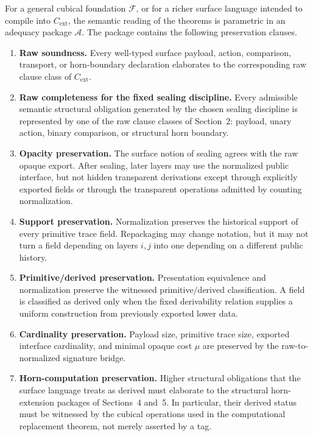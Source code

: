 \documentclass{lmcs}
\begin{document}
\begin{rem}
For a general cubical foundation \(\mathcal F\), or for a richer surface language intended to
compile into \(C_{\mathrm{ext}}\), the semantic reading of the theorems is parametric in an
adequacy package \(\mathcal A\).  The package contains the following preservation clauses.

\begin{enumerate}
\item \textbf{Raw soundness.}  Every well-typed surface payload, action, comparison,
transport, or horn-boundary declaration elaborates to the corresponding raw clause class of
\(C_{\mathrm{ext}}\).

\item \textbf{Raw completeness for the fixed sealing discipline.}  Every admissible semantic
structural obligation generated by the chosen sealing discipline is represented by one of the
raw clause classes of Section~2: payload, unary action, binary comparison, or structural horn
boundary.

\item \textbf{Opacity preservation.}  The surface notion of sealing agrees with the raw opaque
export.  After sealing, later layers may use the normalized public interface, but not hidden
transparent derivations except through explicitly exported fields or through the transparent
operations admitted by counting normalization.

\item \textbf{Support preservation.}  Normalization preserves the historical support of every
primitive trace field.  Repackaging may change notation, but it may not turn a field depending
on layers \(i,j\) into one depending on a different public history.

\item \textbf{Primitive/derived preservation.}  Presentation equivalence and normalization
preserve the witnessed primitive/derived classification.  A field is classified as derived
only when the fixed derivability relation supplies a uniform construction from previously
exported lower data.

\item \textbf{Cardinality preservation.}  Payload size, primitive trace size, exported
interface cardinality, and minimal opaque cost \(\mu\) are preserved by the raw-to-normalized
signature bridge.

\item \textbf{Horn-computation preservation.}  Higher structural obligations that the surface
language treats as derived must elaborate to the structural horn-extension packages of
Sections~4 and~5.  In particular, their derived status must be witnessed by the cubical
operations used in the computational replacement theorem, not merely asserted by a tag.


\end{enumerate}
\end{rem}
\end{document}
